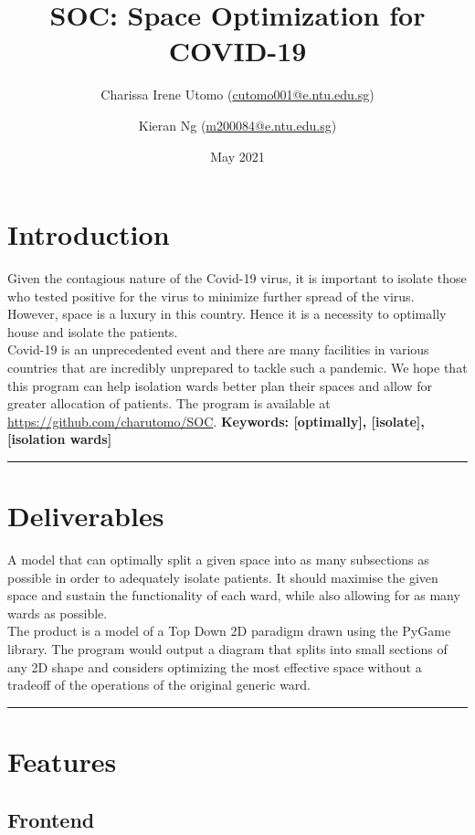 \documentclass{article}
\title{SOC: Space Optimization for COVID-19}
\author{Charissa Irene Utomo (\href{mailto:cutomo001@e.ntu.edu.sg}{cutomo001@e.ntu.edu.sg})}
\author{Kieran Ng (\href{mailto:m200084@e.ntu.edu.sg}{m200084@e.ntu.edu.sg})}
\affil{Nanyang Technological University, \\School of Physical and Mathematical Sciences}
\date{May 2021}
\begin{document}
\maketitle
\section{Introduction}
Given the contagious nature of the Covid-19 virus, it is important to isolate those who tested positive for the virus to minimize further spread of the virus. However, space is a luxury in this country. Hence it is a necessity to optimally house and isolate the patients.\\
\newline
Covid-19 is an unprecedented event and there are many facilities in various countries that are incredibly unprepared to tackle such a pandemic. We hope that this program can help
isolation wards better plan their spaces and allow for greater allocation of patients. The program is available at 
\url{https://github.com/charutomo/SOC}.
\newline
\textbf{Keywords: [optimally], [isolate], [isolation wards]}
\par\noindent\rule{\textwidth}{0.4pt}


\section{Deliverables}
A model that can optimally split a given space into as many subsections as possible in order to adequately isolate patients. It should maximise the given space and sustain the functionality of each ward, while also allowing for as many wards as possible.\\
\newline
The product is a model of a Top Down 2D paradigm drawn using the PyGame library. The program would output a diagram that splits into small sections of any 2D shape and considers optimizing the most effective space without a tradeoff of the operations of the original generic ward.
\par\noindent\rule{\textwidth}{0.4pt}

\section{Features}
\subsection{Frontend}
\end{document}
